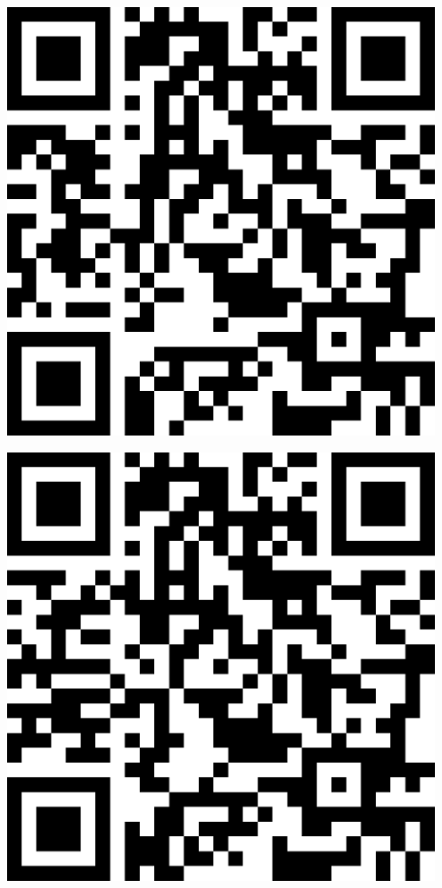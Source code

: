 \documentclass[letterpaper]{article}
\begin{document}
 \endgroup 
 \vspace*{\fill} 
 \pagebreak 
{} 
 \vspace*{\fill} 
 \begingroup 
 \centerline{\includegraphics[scale=1,width=5in,height=5in]{Office3645.png}} 
 \endgroup 
 \vspace*{\fill} 
 \pagebreak 
{} 
 \vspace*{\fill} 
 \begingroup 
 \centerline{\includegraphics[scale=1,width=5in,height=5in]{Office3647.png}} 
\end{document}
